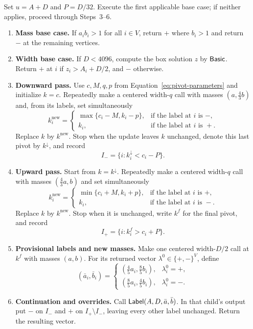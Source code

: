 \begin{procedure}[$\Label(A,D,a,b)$]
\label{alg:label}
Set $u=A+D$ and $P=D/32$. Execute the first applicable base case;
if neither applies, proceed through Steps~3--6.
\begin{enumerate}[label=\textbf{\arabic*.},leftmargin=*]
\item\label{step:mass-base}\textbf{Mass base case.}
If $a_i b_i>1$ for all $i\in V$, return $+$ where $b_i>1$ and
return $-$ at the remaining vertices.

\item\label{step:width-base}\textbf{Width base case.}
If $D<4096$, compute the box solution $z$ by $\mathsf{Basic}$.
Return $+$ at $i$ if $z_i>A_i+D/2$, and $-$ otherwise.

\item\label{step:down}\textbf{Downward pass.}
Use $c,M,q,p$ from Equation~\eqref{eq:pivot-parameters} and
initialize $k=c$. Repeatedly make a centered width-$q$ call with
masses $(a,\frac43 b)$ and, from its labels, set simultaneously
\[
 k_i^{\mathrm{new}}=
 \begin{cases}
   \max\{c_i-M,k_i-p\},&\text{if the label at }i\text{ is }-,\\
   k_i,&\text{if the label at }i\text{ is }+.
 \end{cases}
\]
Replace $k$ by $k^{\mathrm{new}}$. Stop when the update leaves
$k$ unchanged, denote this last pivot by $k^{\downarrow}$, and
record
\[
                       I_- =\{i:k_i^{\downarrow}<c_i-P\}.
\]

\item\label{step:up}\textbf{Upward pass.}
Start from $k=k^{\downarrow}$. Repeatedly make a centered width-$q$
call with masses $(\frac43 a,b)$ and set simultaneously
\[
 k_i^{\mathrm{new}}=
 \begin{cases}
   \min\{c_i+M,k_i+p\},&\text{if the label at }i\text{ is }+,\\
   k_i,&\text{if the label at }i\text{ is }-.
 \end{cases}
\]
Replace $k$ by $k^{\mathrm{new}}$. Stop when it is unchanged,
write $k^f$ for the final pivot, and record
\[
                       I_+=\{i:k_i^f>c_i+P\}.
\]

\item\label{step:provisional}\textbf{Provisional labels and new masses.}
Make one centered width-$D/2$ call at $k^f$ with masses $(a,b)$.
For its returned vector $\lambda^0\in\{+,-\}^V$, define
\begin{equation}
 (\bar a_i,\bar b_i)=
 \begin{cases}
  (\frac45 a_i,\frac85 b_i),&\lambda_i^0=+,\\[1mm]
  (\frac85 a_i,\frac45 b_i),&\lambda_i^0=-.
 \end{cases}
 \label{eq:reweighting}
\end{equation}

\item\label{step:continuation}\textbf{Continuation and overrides.}
Call $\mathsf{Label}(A,D,\bar a,\bar b)$. In that child's output put
$-$ on $I_-$ and $+$ on $I_+\setminus I_-$, leaving every
other label unchanged. Return the resulting vector.
\end{enumerate}
\end{procedure}

